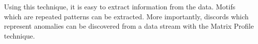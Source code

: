 Using this technique, it is easy to extract information from the data. Motifs which are repeated patterns can be extracted. More importantly, discords which represent anomalies can be discovered from a data stream with the Matrix Profile technique.









